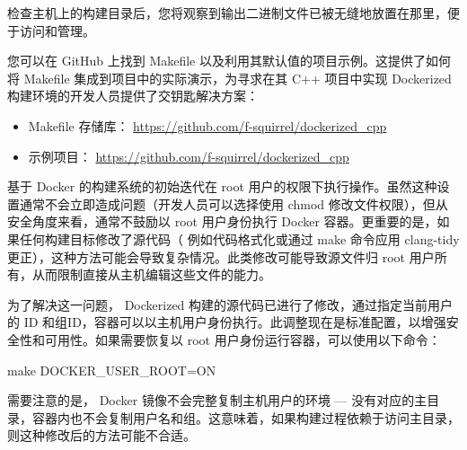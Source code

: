 检查主机上的构建目录后，您将观察到输出二进制文件已被无缝地放置在那里，便于访问和管理。

您可以在 GitHub 上找到 Makefile 以及利用其默认值的项目示例。这提供了如何将 Makefile 集成到项目中的实际演示，为寻求在其 C++ 项目中实现 Dockerized 构建环境的开发人员提供了交钥匙解决方案：

\begin{itemize}
\item
Makefile 存储库： \url{https://github.com/f-squirrel/dockerized_cpp}

\item
示例项目： \url{https://github.com/f-squirrel/dockerized_cpp}
\end{itemize}


基于 Docker 的构建系统的初始迭代在 root 用户的权限下执行操作。虽然这种设置通常不会立即造成问题（开发人员可以选择使用 chmod 修改文件权限），但从安全角度来看，通常不鼓励以 root 用户身份执行 Docker 容器。更重要的是，如果任何构建目标修改了源代码（ 例如代码格式化或通过 make 命令应用 clang-tidy 更正），这种方法可能会导致复杂情况。此类修改可能导致源文件归 root 用户所有，从而限制直接从主机编辑这些文件的能力。

为了解决这一问题， Dockerized 构建的源代码已进行了修改，通过指定当前用户的 ID 和组ID，容器可以以主机用户身份执行。此调整现在是标准配置，以增强安全性和可用性。如果需要恢复以 root 用户身份运行容器，可以使用以下命令：

\begin{shell}
make DOCKER_USER_ROOT=ON
\end{shell}

需要注意的是， Docker 镜像不会完整复制主机用户的环境 — 没有对应的主目录，容器内也不会复制用户名和组。这意味着，如果构建过程依赖于访问主目录，则这种修改后的方法可能不合适。















